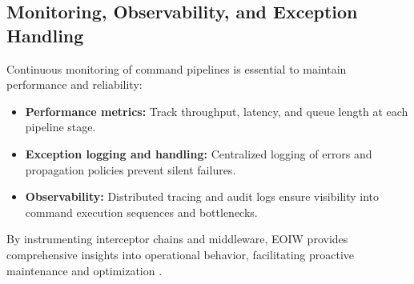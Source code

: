 \subsection{Monitoring, Observability, and Exception Handling}
Continuous monitoring of command pipelines is essential to maintain performance and reliability:

\begin{itemize}
    \item \textbf{Performance metrics:} Track throughput, latency, and queue length at each pipeline stage.
    \item \textbf{Exception logging and handling:} Centralized logging of errors and propagation policies prevent silent failures.
    \item \textbf{Observability:} Distributed tracing and audit logs ensure visibility into command execution sequences and bottlenecks.
\end{itemize}

By instrumenting interceptor chains and middleware, EOIW provides comprehensive insights into operational behavior, facilitating proactive maintenance and optimization \cite{liu2013observability}.